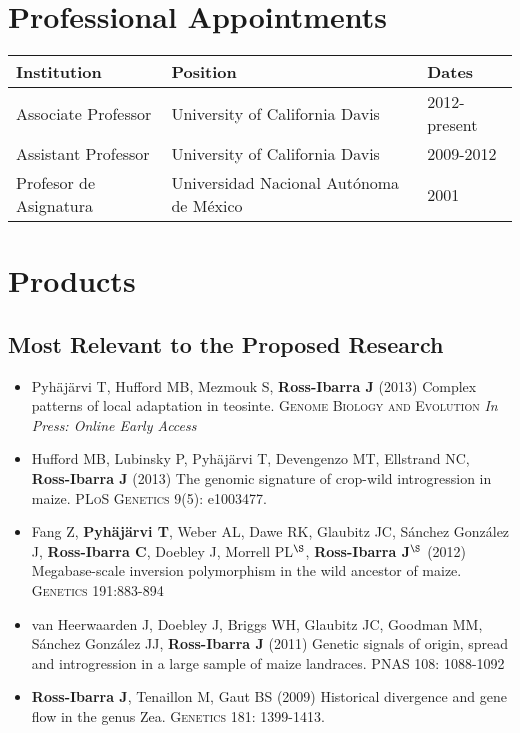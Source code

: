 \documentclass[11pt]{article}
\begin{document}
\section{Professional Appointments}

\begin{tabular}{l l l}
Institution                              & Position                 & Dates\\
\hline
Associate Professor & University of California Davis &		2012-present \\
Assistant Professor & University of California Davis &		2009-2012 \\
Profesor de Asignatura & Universidad Nacional Aut\'{o}noma de M\'{e}xico & 2001 \\
\hline
\end{tabular}

\section{Products}

\subsection*{Most Relevant to the Proposed Research}

\begin{itemize} \setlength{\itemsep}{0pt} \setlength{\parskip}{2pt} \setlength{\parsep}{0pt}

\item Pyh\"aj\"arvi T, Hufford MB, Mezmouk S, {\bf Ross-Ibarra J} (2013) Complex patterns of local adaptation in teosinte. \textsc{Genome Biology and Evolution} \emph{In Press: Online Early Access}

\item Hufford MB, Lubinsky P, Pyh\"aj\"arvi T, Devengenzo MT, Ellstrand NC, {\bf Ross-Ibarra J} (2013) The genomic signature of crop-wild introgression in maize. \textsc{PLoS Genetics} 9(5): e1003477. %


\item Fang Z, {\bf Pyh\"aj\"arvi T}, Weber AL, Dawe RK, Glaubitz JC, S\'{a}nchez Gonz\'{a}lez J, {\bf Ross-Ibarra C}, Doebley J, Morrell PL$^\S$, {\bf Ross-Ibarra J}$^\S$  (2012) Megabase-scale inversion polymorphism in the wild ancestor of maize. \textsc{Genetics} 191:883-894 

\item van Heerwaarden J, Doebley J, Briggs WH, Glaubitz JC, Goodman MM, S\'{a}nchez Gonz\'{a}lez JJ, {\bf Ross-Ibarra J} (2011) Genetic signals of origin, spread and introgression in a large sample of maize landraces. PNAS 108: 1088-1092

\item {\bf Ross-Ibarra J}, Tenaillon M, Gaut BS (2009) Historical divergence and gene flow in the genus Zea.  \textsc{Genetics} 181: 1399-1413.


\end{itemize}
\end{document}
